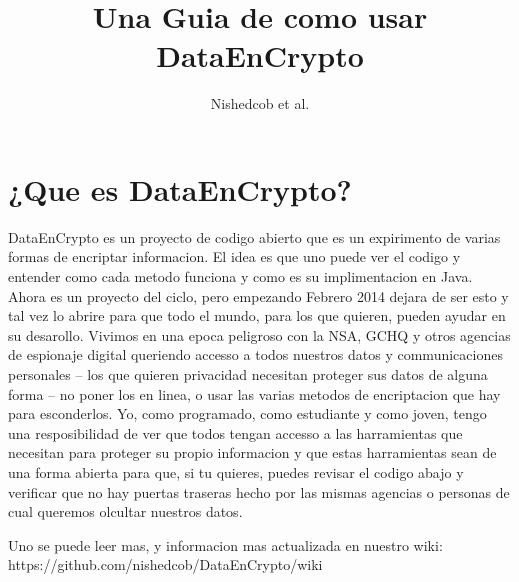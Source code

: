 \documentclass{article}
\author{Nishedcob et al.}
\title{Una Guia de como usar DataEnCrypto}
\begin{document}
  \maketitle
  \tableofcontents
  \section{¿Que es DataEnCrypto?}
    DataEnCrypto es un proyecto de codigo abierto que es un expirimento de varias formas de encriptar informacion. El idea es que uno puede ver el codigo y entender como cada metodo funciona y como es su implimentacion en Java. Ahora es un proyecto del ciclo, pero empezando Febrero 2014 dejara de ser esto y tal vez lo abrire para que todo el mundo, para los que quieren, pueden ayudar en su desarollo. Vivimos en una epoca peligroso con la NSA, GCHQ y otros agencias de espionaje digital queriendo accesso a todos nuestros datos y communicaciones personales -- los que quieren privacidad necesitan proteger sus datos de alguna forma -- no poner los en linea, o usar las varias metodos de encriptacion que hay para esconderlos. Yo, como programado, como estudiante y como joven, tengo una resposibilidad de ver que todos tengan accesso a las harramientas que necesitan para proteger su propio informacion y que estas harramientas sean de una forma abierta para que, si tu quieres, puedes revisar el codigo abajo y verificar que no hay puertas traseras hecho por las mismas agencias o personas de cual queremos olcultar nuestros datos.

    Uno se puede leer mas, y informacion mas actualizada en nuestro wiki: https://github.com/nishedcob/DataEnCrypto/wiki
\end{document}
